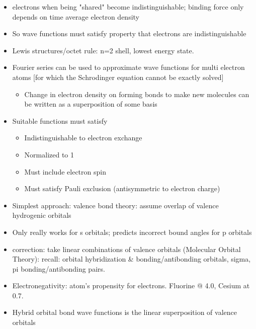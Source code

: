 \documentclass[10pt]{article}
\begin{document}
\begin{itemize}
	\item electrons when being "shared" become indistinguishable; binding force only depends on time average electron density
	\item So wave functions must satisfy property that electrons are indistinguishable
	\item Lewis structures/octet rule: n=2 shell, lowest energy state.
	\item Fourier series can be used to approximate wave functions for multi electron atoms [for which the Schrodinger equation cannot be exactly solved]
	\begin{itemize}
		\item Change in electron density on forming bonds to make new molecules can be written as a superposition of some basis
	\end{itemize}
\item Suitable functions must satisfy
	\begin{itemize}
		\item Indistinguishable to electron exchange
		\item Normalized to 1
		\item Must include electron spin
		\item Must satisfy Pauli exclusion (antisymmetric to electron charge)
	\end{itemize}
\item Simplest approach: valence bond theory: assume overlap of valence hydrogenic orbitals
\item Only really works for s orbitals; predicts incorrect bound angles for p orbitals
\item correction: take linear combinations of valence orbitals (Molecular Orbital Theory): recall: orbital hybridization \& bonding/antibonding orbitals, sigma, pi bonding/antibonding pairs.
\item Electronegativity: atom's propensity for electrons. Fluorine @ 4.0, Cesium at 0.7. 
\item Hybrid orbital bond wave functions is the linear  superposition of valence orbitals
\end{itemize}
\end{document}
